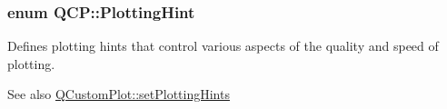 \hypertarget{namespaceQCP_a5400e5fcb9528d92002ddb938c1f4ef4}{
\subsubsection[{\-Plotting\-Hint}]{\setlength{\rightskip}{0pt plus 5cm}enum {\bf \-Q\-C\-P\-::\-Plotting\-Hint}}}\label{namespaceQCP_a5400e5fcb9528d92002ddb938c1f4ef4}
\-Defines plotting hints that control various aspects of the quality and speed of plotting.

\begin{DoxySeeAlso}{\-See also}
\hyperlink{classQCustomPlot_a94a33cbdadbbac5934843508bcfc210d}{\-Q\-Custom\-Plot\-::set\-Plotting\-Hints} 
\end{DoxySeeAlso}
